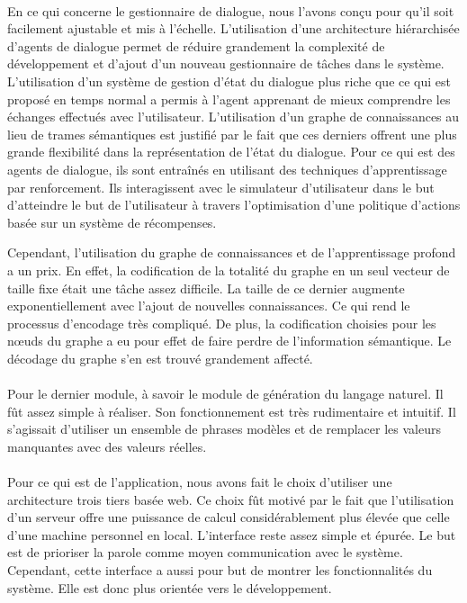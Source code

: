 
\paragraph{}
En ce qui concerne le gestionnaire de dialogue, nous l'avons conçu pour qu'il soit facilement ajustable et mis à l'échelle. L'utilisation d'une architecture hiérarchisée d'agents de dialogue permet de réduire grandement la complexité de développement et d'ajout d'un nouveau gestionnaire de tâches dans le système. L'utilisation d'un système de gestion d'état du dialogue plus riche que ce qui est proposé en temps normal a permis à l'agent apprenant de mieux comprendre les échanges effectués avec l'utilisateur. L'utilisation d'un graphe de connaissances au lieu de trames sémantiques est justifié par le fait que ces derniers offrent une plus grande flexibilité dans la représentation de l'état du dialogue. Pour ce qui est des agents de dialogue, ils sont entraînés en utilisant des techniques d'apprentissage par renforcement. Ils interagissent avec le simulateur d'utilisateur dans le but d'atteindre le but de l'utilisateur à travers l'optimisation d'une politique d'actions basée sur un système de récompenses.

Cependant, l'utilisation du graphe de connaissances et de l'apprentissage profond a un prix. En effet, la codification de la totalité du graphe en un seul vecteur de taille fixe était une tâche assez difficile. La taille de ce dernier augmente exponentiellement avec l'ajout de nouvelles connaissances. Ce qui rend le processus d'encodage très compliqué. De plus, la codification choisies pour les n\oe{}uds du graphe a eu pour effet de faire perdre de l'information sémantique. Le décodage du graphe s'en est trouvé grandement affecté.



\paragraph{}
Pour le dernier module, à savoir le module de génération du langage naturel. Il fût assez simple à réaliser. Son fonctionnement est très rudimentaire et intuitif. Il s'agissait d'utiliser un ensemble de phrases modèles et de remplacer les valeurs manquantes avec des valeurs réelles.


\paragraph{}
Pour ce qui est de l'application, nous avons fait le choix d'utiliser une architecture trois tiers basée web. Ce choix fût motivé par le fait que l'utilisation d'un serveur offre une puissance de calcul considérablement plus élevée que celle d'une machine personnel en local. L'interface reste assez simple et épurée. Le but est de prioriser la parole comme moyen communication avec le système. Cependant, cette interface a aussi pour but de montrer les fonctionnalités du système. Elle est donc plus orientée vers le développement.



